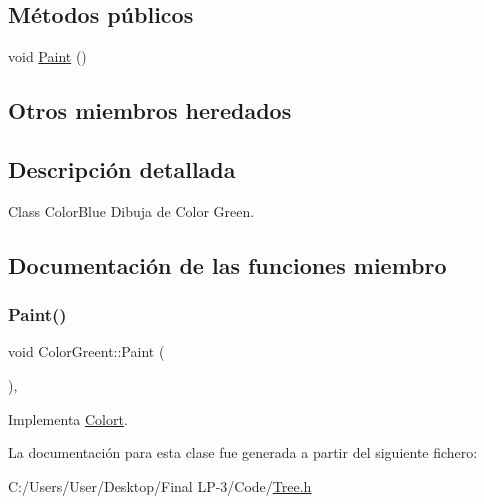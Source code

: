 \subsection*{Métodos públicos}
\begin{DoxyCompactItemize}
\item 
void \mbox{\hyperlink{class_color_greent_afa9951c020c0a7cfd1781b3f70623572}{Paint}} ()
\end{DoxyCompactItemize}
\subsection*{Otros miembros heredados}


\subsection{Descripción detallada}
Class Color\+Blue Dibuja de Color Green. 

\subsection{Documentación de las funciones miembro}
\mbox{\label{class_color_greent_afa9951c020c0a7cfd1781b3f70623572}} 
\subsubsection{\texorpdfstring{Paint()}{Paint()}}
{\footnotesize\ttfamily void Color\+Greent\+::\+Paint (\begin{DoxyParamCaption}{ }\end{DoxyParamCaption})\hspace{0.3cm}{\ttfamily [inline]}, {\ttfamily [virtual]}}



Implementa \mbox{\hyperlink{class_colort_aee987a82c2c47304d7406816d6ca0da7}{Colort}}.



La documentación para esta clase fue generada a partir del siguiente fichero\+:\begin{DoxyCompactItemize}
\item 
C\+:/\+Users/\+User/\+Desktop/\+Final L\+P-\/3/\+Code/\mbox{\hyperlink{_tree_8h}{Tree.\+h}}\end{DoxyCompactItemize}
